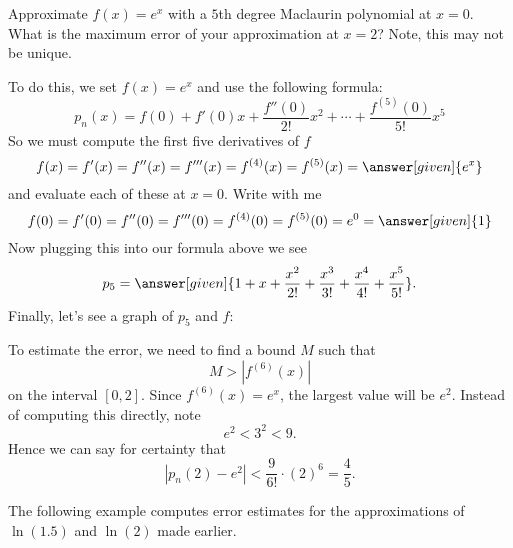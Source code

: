 \documentclass{ximera}
\begin{document}
\begin{example}
  Approximate $f(x) = e^x$ with a $5$th degree Maclaurin polynomial at
  $x = 0$.  What is the maximum error of your approximation at $x=2$?
  Note, this may not be unique.
  \begin{explanation}
    To do this, we set $f(x) =e^x$ and use the following formula:
    \[
    p_n(x) = f(0) + f'(0)x +\frac{f''(0)}{2!}x^2+\cdots +\frac{f^{(5)}(0)}{5!}x^5
    \]
    So we must compute the first five derivatives of $f$
    \[
      f(x) = f'(x) = f''(x) = f'''(x) = f^{(4)}(x)  = f^{(5)}(x) = \answer[given]{e^x}
    \]
    and evaluate each of these at $x=0$. Write with me
    \[
    f(0) = f'(0) = f''(0) = f'''(0) = f^{(4)}(0)  = f^{(5)}(0) = e^0 = \answer[given]{1}
    \]
    Now plugging this into our formula above we see
    \[
    p_5 = \answer[given]{1 + x + \frac{x^2}{2!} + \frac{x^3}{3!} + \frac{x^4}{4!} + \frac{x^5}{5!}}.
    \]
    Finally, let's see a graph of $p_5$ and $f$:
      \begin{image}
      \end{image}
      To estimate the error, we need to find a bound $M$ such that
      \[
      M >|f^{(6)}(x)|
      \]
      on the interval $[0,2]$. Since $f^{(6)}(x) = e^x$, the largest
      value will be $e^2$. Instead of computing this directly, note
      \[
      e^2 < 3^2< 9.
      \]
      Hence we can say for certainty that
      \[
      |p_n(2) - e^2| < \frac{9}{6!}\cdot(2)^6 = \frac{4}{5}.
      \]
  \end{explanation}
\end{example}


The following example computes error estimates for the approximations
of $\ln(1.5)$ and $\ln(2)$ made earlier.
\end{document}
